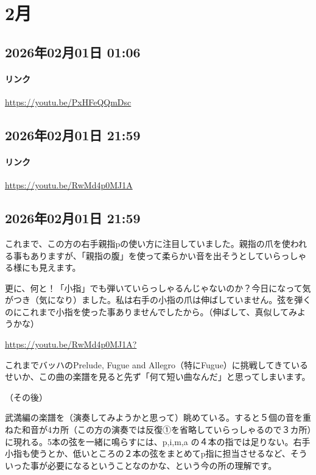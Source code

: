 \section{2月}

\subsection*{2026年02月01日 01:06}

\paragraph{リンク}
\url{https://youtu.be/PxHFeQQmDsc}

\subsection*{2026年02月01日 21:59}

\paragraph{リンク}
\url{https://youtu.be/RwMd4p0MJ1A}

\subsection*{2026年02月01日 21:59}

これまで、この方の右手親指pの使い方に注目していました。親指の爪を使われる事もありますが、「親指の腹」を使って柔らかい音を出そうとしていらっしゃる様にも見えます。

更に、何と！「小指」でも弾いていらっしゃるんじゃないのか？今日になって気がつき（気になり）ました。私は右手の小指の爪は伸ばしていません。弦を弾くのにこれまで小指を使った事ありませんでしたから。（伸ばして、真似してみようかな）

\url{https://youtu.be/RwMd4p0MJ1A?}

これまでバッハのPrelude, Fugue and Allegro（特にFugue）に挑戦してきているせいか、この曲の楽譜を見ると先ず「何て短い曲なんだ」と思ってしまいます。

（その後）

武満編の楽譜を（演奏してみようかと思って）眺めている。すると５個の音を重ねた和音が4カ所（この方の演奏では反復①を省略していらっしゃるので３カ所）に現れる。5本の弦を一緒に鳴らすには、p,i,m,a の４本の指では足りない。右手小指も使うとか、低いところの２本の弦をまとめてp指に担当させるなど、そういった事が必要になるということなのかな、という今の所の理解です。


